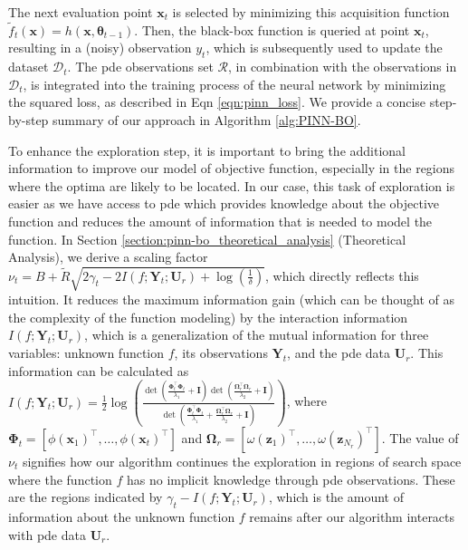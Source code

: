 The next evaluation point $\mathbf{x}_t$ is selected by minimizing this acquisition function $\widetilde {f}_t(\mathbf{x}) = h(\mathbf{x}, \boldsymbol{\theta}_{t-1})$. Then, the black-box function is queried at point $\mathbf{x}_t$, resulting in a (noisy) observation $y_t$, which is subsequently used to update the dataset $\mathcal{D}_t$. The \ac{pde} observations set $\mathcal{R}$, in combination with the observations in $\mathcal{D}_t$, is integrated into the training process of the neural network by minimizing the squared loss, as described in Eqn \ref{eqn:pinn_loss}. We provide a concise step-by-step summary of our approach in Algorithm \ref{alg:PINN-BO}.

To enhance the exploration step, it is important to bring the additional information to improve our model of objective function, especially in the regions where the optima are likely to be located. In our case, this task of exploration is easier as we have access to \ac{pde} which provides knowledge about the objective function and reduces the amount of information that is needed to model the function. In Section \ref{section:pinn-bo_theoretical_analysis} (Theoretical Analysis), we derive a scaling factor $\nu_t = B + \widetilde{R} \sqrt{2\gamma_t - 2 I(f; \mathbf{Y}_t; \mathbf{U}_r)  + \log(\frac{1}{\delta})}$,  which directly reflects this intuition. It reduces the maximum information gain  (which can be thought of as the complexity of the function modeling) by the interaction information $I(f; \mathbf{Y}_t; \mathbf{U}_r)$, which is a generalization of the mutual information for three variables: unknown function $f$,  its observations $\mathbf{Y}_t$, and the \ac{pde} data $\mathbf{U}_r$. This information can be calculated as $I(f; \mathbf{Y}_t; \mathbf{U}_r) = \frac{1}{2}  \log (\frac{\det(\frac{\boldsymbol{\Phi}_t^\top \boldsymbol{\Phi}_t}{\lambda_1} + \mathbf{I})\det(\frac{\boldsymbol{\Omega}_r^\top \boldsymbol{\Omega}_r}{\lambda_2} + \mathbf{I})}{\det(\frac{\boldsymbol{\Phi}_t^\top \boldsymbol{\Phi}_t}{\lambda_1} + \frac{\boldsymbol{\Omega}_r^\top \boldsymbol{\Omega}_r}{\lambda_2} + \mathbf{I})}) $, where $\boldsymbol{\Phi}_t  = [\phi(\mathbf{x}_1)^\top,\dots, \phi(\mathbf{x}_t)^\top ]$ and 
$\boldsymbol{\Omega}_r  = [\omega(\mathbf{z}_1)^\top, \dots, \omega(\mathbf{z}_{N_r})^\top ]$. The value of $\nu_t$ signifies how our algorithm continues the exploration in regions of search space where the function $f$ has no implicit knowledge through \ac{pde} observations. These are the regions indicated by $\gamma_t - I(f; \mathbf{Y}_t; \mathbf{U}_r)$, which is the amount of information about the unknown function $f$ remains after our algorithm interacts with \ac{pde} data $\mathbf{U}_r$.  

